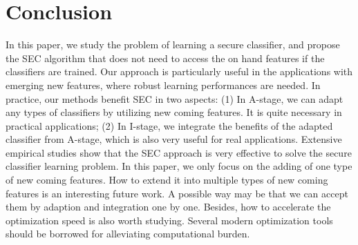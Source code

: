\documentclass[10pt,journal,compsoc]{IEEEtran}
\begin{document}
\section{Conclusion}
\label{sec_con}

In this paper, we study the problem of learning a secure classifier, and propose the SEC algorithm that does not need to access the on hand features if the classifiers are trained. Our approach is particularly useful in the applications with emerging new features, where robust learning performances are needed. In practice, our methods benefit SEC in two aspects: (1) In A-stage, we can adapt any types of classifiers by utilizing new coming features. It is quite necessary in practical applications; (2) In I-stage, we integrate the benefits of the adapted classifier from A-stage, which is also very useful for real applications. Extensive empirical studies show that the SEC approach is very effective to solve the secure classifier learning problem. In this paper, we only focus on the adding of one type of new coming features. How to extend it into multiple types of new coming features is an interesting future work. A possible way may be that we can accept them by adaption and integration one by one. Besides, how to accelerate the optimization speed is also worth studying. Several modern optimization tools should be borrowed for alleviating computational burden.



\end{document}
